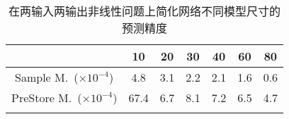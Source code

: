 \begin{center}
\begin{table}
	\caption{在两输入两输出非线性问题上简化网络不同模型尺寸的预测精度}
	\renewcommand\arraystretch{1.2}
	\setlength{\tabcolsep}{12pt}
	\begin{tabular}{ccccccc}
	\toprule
		 									&	10		&	20		&	30		&	40		&	60		&	80		\\	\midrule
	Sample M.~(\(\times 10^{-4}\))			&	4.8		&	3.1		&	2.2		&	2.1		&	1.6		&	0.6	 \\	\hline
	PreStore M.~(\(\times 10^{-4}\))	&	67.4	&	6.7		&	8.1		&	7.2		&	6.5		&	4.7	\\	
	\bottomrule
	\label{tab:2In2Out}
	\end{tabular}
\end{table}
\vspace{-3em}
\end{center}


